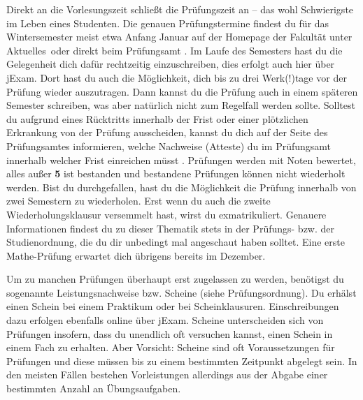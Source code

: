 
Direkt an die Vorlesungszeit schließt die Prüfungszeit an – das wohl Schwierigste im Leben eines Studenten.
Die genauen Prüfungstermine findest du für das Wintersemester meist etwa Anfang Januar auf der Homepage der Fakultät  unter \glqq Aktuelles\grqq\ oder direkt beim Prüfungsamt .
Im Laufe des Semesters hast du die Gelegenheit dich dafür rechtzeitig einzuschreiben, dies erfolgt auch hier über jExam.
Dort hast du auch die Möglichkeit, dich bis zu drei Werk(!)tage vor der Prüfung wieder auszutragen. Dann kannst du die Prüfung auch in einem späteren Semester schreiben, was aber natürlich nicht zum Regelfall werden sollte.
Solltest du aufgrund eines Rücktritts innerhalb der Frist oder einer plötzlichen Erkrankung von der Prüfung ausscheiden, kannst du dich auf der Seite des Prüfungsamtes informieren, welche Nachweise (Atteste) du im Prüfungsamt innerhalb welcher Frist einreichen müsst .
Prüfungen werden mit Noten bewertet, alles außer \textbf{5} ist bestanden und bestandene Prüfungen können nicht wiederholt werden.
Bist du durchgefallen, hast du die Möglichkeit die Prüfung innerhalb von zwei Semestern zu wiederholen. Erst wenn du auch die zweite Wiederholungsklausur versemmelt hast, wirst du exmatrikuliert.
Genauere Informationen findest du zu dieser Thematik stets in der Prüfungs- bzw. der Studienordnung, die du dir unbedingt mal angeschaut haben solltet.
Eine erste Mathe-Prüfung erwartet dich übrigens bereits im Dezember.


Um zu manchen Prüfungen überhaupt erst zugelassen zu werden, benötigst du sogenannte Leistungsnachweise bzw. Scheine (siehe Prüfungsordnung).
Du erhälst einen Schein bei einem Praktikum oder bei Scheinklausuren.
Einschreibungen dazu erfolgen ebenfalls online über jExam.
Scheine unterscheiden sich von Prüfungen insofern, dass du unendlich oft versuchen kannst, einen Schein in einem Fach zu erhalten.
Aber Vorsicht: Scheine sind oft Voraussetzungen für Prüfungen und diese müssen bis zu einem bestimmten Zeitpunkt abgelegt sein.
In den meisten Fällen bestehen Vorleistungen allerdings aus der Abgabe einer bestimmten Anzahl an Übungsaufgaben.

\label{sec:sprachausbildung}

